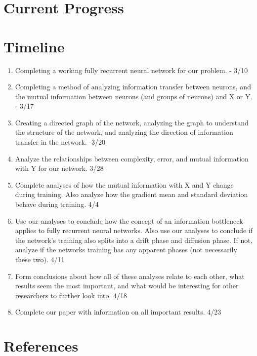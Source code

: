 \section{Current Progress}

\section{Timeline}
\begin{enumerate}
	\item Completing a working fully recurrent neural network for our problem. - 3/10
	\item Completing a method of analyzing information transfer between neurons, and the mutual information between neurons (and groups of neurons) and X or Y. - 3/17
	\item Creating a directed graph of the network, analyzing the graph to understand the structure of the network, and analyzing the direction of information transfer in the network. -3/20
	\item Analyze the relationships between complexity, error, and mutual information with Y for our network. 3/28
	\item Complete analyses of how the mutual information with X and Y change during training. Also analyze how the gradient mean and standard deviation behave during training. 4/4
	\item Use our analyses to conclude how the concept of an information bottleneck applies to fully recurrent neural networks. Also use our analyses to conclude if the network’s training also splits into a drift phase and diffusion phase. If not, analyze if the networks training has any apparent phases (not necessarily these two). 4/11
	\item Form conclusions about how all of these analyses relate to each other, what results seem the most important, and what would be interesting for other researchers to further look into. 4/18
	\item Complete our paper with information on all important results. 4/23
\end{enumerate}

\section{References}



